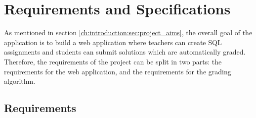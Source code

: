 \chapter{Requirements and Specifications} \label{ch:reqandspec}

As mentioned in section \ref{ch:introduction:sec:project_aims}, the overall goal of the application is to build a web application where teachers can create SQL assignments and students can submit solutions which are automatically graded. Therefore, the requirements of the project can be split in two parts: the requirements for the web application, and the requirements for the grading algorithm.

\section{Requirements} \label{ch:reqandspec:sec:rec}

